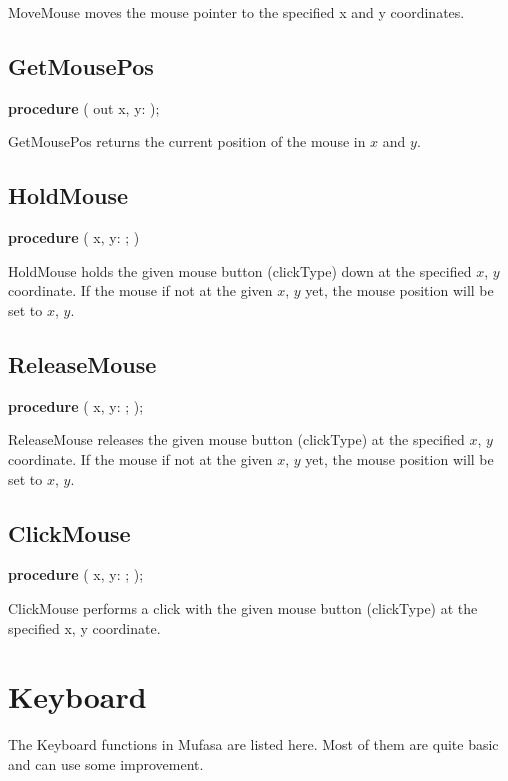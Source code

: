 \documentclass[a4paper]{report}
\begin{document}
MoveMouse moves the mouse pointer to the specified x and y coordinates.

\subsection{GetMousePos}
\textbf{procedure} {\color{blue}{GetMousePos}}({\color{typeRed}
{out x, y: }}{\color{typeGreen}{Integer}});

GetMousePos returns the current position of the mouse in $x$ and $y$.

\subsection{HoldMouse}
\textbf{procedure} {\color{blue}{HoldMouse}}({\color{typeRed}
{x, y: }}{\color{typeGreen}{Integer}}; {\color{typeRed}{clickType :}}
{\color{typeGreen}{clickType}})

HoldMouse holds the given mouse button (clickType) down at the specified $x$, $y$ 
coordinate. If the mouse if not at the given $x$, $y$ yet, the mouse position
will be set to $x$, $y$.

\subsection{ReleaseMouse}
\textbf{procedure} {\color{blue}{ReleaseMouse}}({\color{typeRed}
{x, y: }}{\color{typeGreen}{Integer}}; {\color{typeRed}{clickType :}}
{\color{typeGreen}{clickType}});

ReleaseMouse releases the given mouse button (clickType) at the specified $x$, $y$ 
coordinate. If the mouse if not at the given $x$, $y$ yet, the mouse position
will be set to $x$, $y$.

\subsection{ClickMouse}
\textbf{procedure} {\color{blue}{ClickMouse}}({\color{typeRed}
{x, y: }}{\color{typeGreen}{Integer}}; {\color{typeRed}{clickType :}}
{\color{typeGreen}{clickType}});

ClickMouse performs a click with the given mouse button (clickType) at the
specified x, y coordinate.

\section{Keyboard}

The Keyboard functions in Mufasa are listed here.
Most of them are quite basic and can use some improvement.
\end{document}
